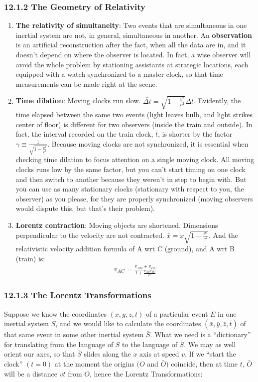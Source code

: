 \documentclass[11pt,letterpaper]{book}
\begin{document}
\subsubsection{12.1.2 The Geometry of Relativity}
    \begin{enumerate}
        \item \textbf{The relativity of simultaneity}: Two events that are simultaneous in one inertial system are not, in general, simultaneous in another. An \textbf{observation} is an artificial reconstruction after the fact, when all the data are in, and it doesn’t depend on where the observer is located. In fact, a wise observer will avoid the whole problem by stationing assistants at strategic locations, each equipped with a watch synchronized to a master clock, so that time measurements can be made right at the scene.
        \item \textbf{Time dilation}: Moving clocks run slow. $\bar{\Delta t} = \sqrt{1 - \frac{v^2}{c^2}}\Delta t$. Evidently, the time elapsed between the same two events (light leaves bulb, and light strikes center of floor) is different for two observers (inside the train and outside). In fact, the interval recorded on the train clock, $\bar{t}$, is shorter by the factor $\gamma \equiv \frac{1}{\sqrt{1 - \frac{v^2}{c^2}}}$. 
        Because moving clocks are not synchronized, it is essential when checking time dilation to focus attention on a single moving clock. All moving clocks runs low by the same factor, but you can’t start timing on one clock and then switch to another because they weren’t in step to begin with. But you can use as many stationary clocks (stationary with respect to you, the observer) as you please, for
        they are properly synchronized (moving observers would dispute this, but that’s their problem).
        \item \textbf{Lorentz contraction}: Moving objects are shortened. Dimensions perpendicular to the velocity are not contracted. $\bar{x} = x \sqrt{1 - \frac{v^2}{c^2}}$. And the relativistic velocity addition formula of A wrt C (ground), and A wrt B (train) is:
        \begin{align}
        v_{AC} = \frac{v_{AB} + v_{BC}}{1 + \frac{v_{AB} v_{BC}}{c^2}}
        \end{align}
    \end{enumerate}
    
\subsubsection{12.1.3 The Lorentz Transformations}
    Suppose we know the coordinates $(x, y, z, t)$ of a particular event $E$ in one inertial system $S$, and we would like to calculate the coordinates $(\bar{x}, \bar{y}, \bar{z}, \bar{t})$ of that same event in some other inertial system $\bar{S}$. What we need is a “dictionary” for translating from the language of $S$ to the language of $\bar{S}$. We may as well orient our axes, so that $\bar{S}$ slides along the $x$ axis at speed $v$. If we “start the clock” $(t = 0)$ at the moment the origins $(O $ and $ \bar{O})$ coincide, then at time $t$, $\bar{O}$ will be a distance $vt$ from $O$, hence the Lorentz Transformations:
    
\end{document}
